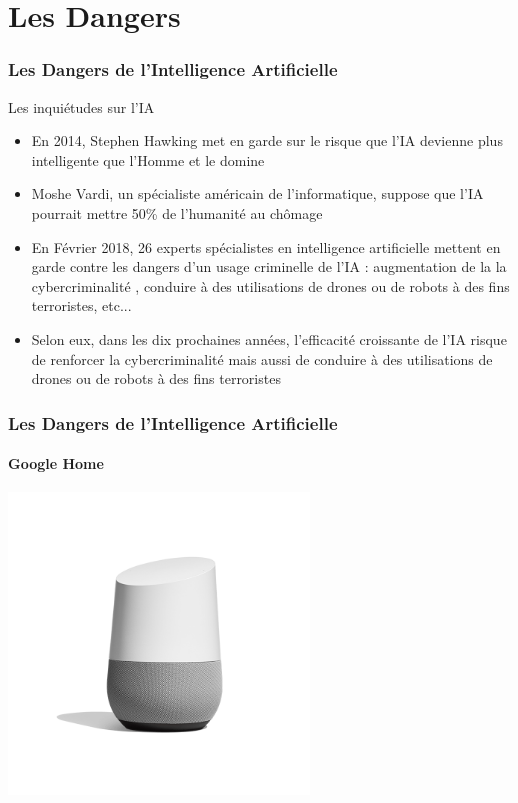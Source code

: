 \documentclass{beamer}
\begin{document}
	
	\section{Les Dangers}
	\begin{frame}
	\frametitle{Les Dangers de l'Intelligence Artificielle}
	\begin{block}{Les inquiétudes sur l'IA}
	\begin{itemize}
	\itemsep1em
		\item En 2014, Stephen Hawking met en garde sur le risque que l'IA devienne plus intelligente que l'Homme et le domine
		\item Moshe Vardi, un spécialiste américain de l'informatique, suppose que l'IA pourrait mettre 50\% de l'humanité au chômage
		\item En Février 2018, 26 experts spécialistes en intelligence artificielle mettent en garde contre les dangers d'un usage criminelle de l'IA : augmentation de la la cybercriminalité , conduire à des utilisations de drones ou de robots à des fins terroristes, etc...
		\item Selon eux, dans les dix prochaines années, l'efficacité croissante de l'IA risque de renforcer la cybercriminalité mais aussi de conduire à des utilisations de drones ou de robots à des fins terroristes
		\end{itemize}
	\end{block}
	\end{frame}

	\begin{frame}
	\frametitle{Les Dangers de l'Intelligence Artificielle}
	\framesubtitle{Google Home}
	\centerline{\includegraphics[height=8cm]{googlehome.png}}
	\end{frame}
	
\end{document}
